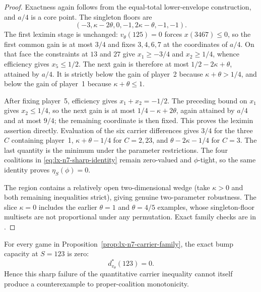 \begin{proof}
Exactness again follows from the equal-total lower-envelope construction, and
$a/4$ is a core point.  The singleton floors are
\[
 (-3,\kappa-2\theta,0,-1,2\kappa-\theta,-1,-1).
\]
The first leximin stage is unchanged: $v_\theta(125)=0$ forces
$x(3467)\leq0$, so the first common gain is at most $3/4$ and fixes
$3,4,6,7$ at the coordinates of $a/4$.  On that face the constraints at
$13$ and $27$ give $x_1\geq-3/4$ and $x_2\geq1/4$, whence efficiency gives
$x_5\leq1/2$.  The next gain is therefore at most
$1/2-2\kappa+\theta$, attained by $a/4$.  It is strictly below the gain of
player~2 because $\kappa+\theta>1/4$, and below the gain of player~1 because
$\kappa+\theta\leq1$.

After fixing player~5, efficiency gives $x_1+x_2=-1/2$.  The preceding
bound on $x_1$ gives $x_2\leq1/4$, so the next gain is at most
$1/4-\kappa+2\theta$, again attained by $a/4$ and at most $9/4$; the
remaining coordinate is then fixed.  This proves the leximin assertion
directly.  Evaluation of the six carrier differences gives $3/4$ for the
three $C$ containing player~1, $\kappa+\theta-1/4$ for $C=2,23$, and
$\theta-2\kappa-1/4$ for $C=3$.  The last quantity is the minimum under the
parameter restrictions.  The four coalitions in
\eqref{eq:lx-n7-sharp-identity} remain zero-valued and $\phi$-tight, so the
same identity proves $\eta_S(\phi)=0$.

The region contains a relatively open two-dimensional wedge (take
$\kappa>0$ and both remaining inequalities strict), giving genuine
two-parameter robustness.  The slice $\kappa=0$ includes the earlier
$\theta=1$ and $\theta=4/5$ examples, whose singleton-floor multisets are not
proportional under any permutation.  Exact family checks are in
.
\end{proof}

\begin{corollary}
\label{cor:lx-n7-carrier-unbumpable}
For every game in Proposition~\ref{prop:lx-n7-carrier-family}, the exact bump
capacity at $S=123$ is zero:
\[
 d^*_{v_\theta}(123)=0.
\]
Hence this sharp failure of the quantitative carrier inequality cannot itself
produce a counterexample to proper-coalition monotonicity.
\end{corollary}

